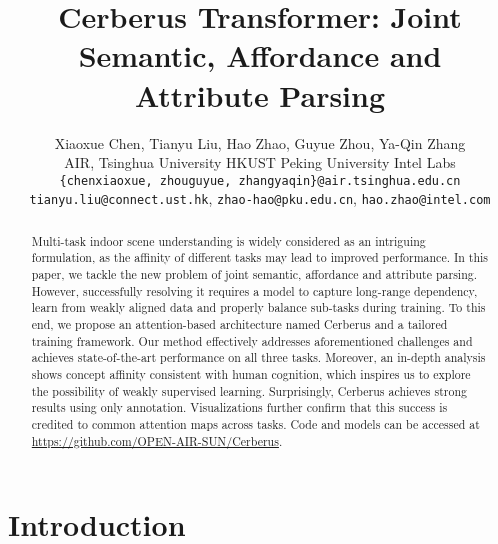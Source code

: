 \documentclass[10pt,twocolumn,letterpaper]{article}
\begin{document}
\title{Cerberus Transformer: Joint Semantic, Affordance and Attribute Parsing
}

\author{Xiaoxue Chen, Tianyu Liu, Hao Zhao, Guyue Zhou, Ya-Qin Zhang \\
	AIR, Tsinghua University HKUST Peking University Intel Labs\\
	{\tt\small \{chenxiaoxue, zhouguyue, zhangyaqin\}@air.tsinghua.edu.cn}\\
	{\tt\small tianyu.liu@connect.ust.hk}, {\tt\small zhao-hao@pku.edu.cn}, {\tt\small hao.zhao@intel.com}}
	


\maketitle

\begin{abstract}
Multi-task indoor scene understanding is widely considered as an intriguing formulation, as the affinity of different tasks may lead to improved performance. In this paper, we tackle the new problem of joint semantic, affordance and attribute parsing. However, successfully resolving it requires a model to capture long-range dependency, learn from weakly aligned data and properly balance sub-tasks during training. To this end, we propose an attention-based architecture named Cerberus and a tailored training framework. Our method effectively addresses aforementioned challenges and achieves state-of-the-art performance on all three tasks. Moreover, an in-depth analysis shows concept affinity consistent with human cognition, which inspires us to explore the possibility of weakly supervised learning. Surprisingly, Cerberus achieves strong results using only  annotation. Visualizations further confirm that this success is credited to common attention maps across tasks. Code and models can be accessed at \url{https://github.com/OPEN-AIR-SUN/Cerberus}.
\end{abstract}

\section{Introduction}
\label{sec:intro}
\end{document}
